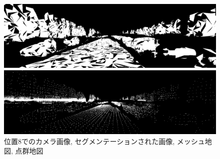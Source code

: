\begin{figure}[htbp]
\begin{minipage}[b]{0.50\hsize}
\begin{center}
  \end{center}
 \end{minipage} \\
  \begin{minipage}[b]{0.50\hsize}
 \begin{center}
  \includegraphics[keepaspectratio, scale=0.18]{./picture/valued_mesh_map_image/image7.jpg}
  \end{center}
 \end{minipage}
 \begin{minipage}[b]{0.50\hsize}
 \begin{center}
  \includegraphics[keepaspectratio, scale=0.18]{./picture/valued_point_map_image/image7.jpg}
  \end{center}
 \end{minipage}
 \caption{位置8でのカメラ画像, セグメンテーションされた画像, メッシュ地図, 点群地図}\label{fig:place8}
\end{figure}

